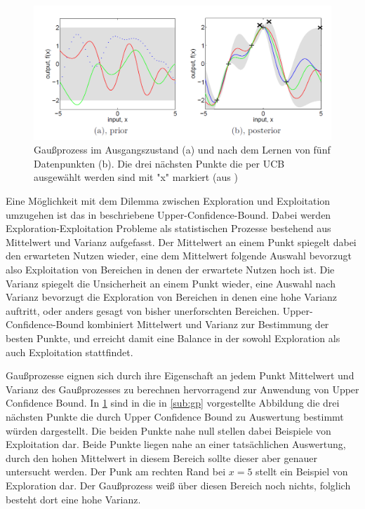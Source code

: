 \begin{figure}[h]
	\centering
	\includegraphics[width=1\linewidth]{bilder/ucb}
	\caption[Gaußprozess im Ausgangszustand (a) und nach dem Lernen von fünf Datenpunkten (b).]{Gaußprozess im Ausgangszustand (a) und nach dem Lernen von fünf Datenpunkten (b). Die drei nächsten Punkte die per UCB ausgewählt werden sind mit "x" markiert (aus \cite{Rasmussen.2008})}
	\label{fig:ucb}
\end{figure}
Eine Möglichkeit mit dem Dilemma zwischen Exploration und Exploitation umzugehen ist das in \cite{Auer.2002} beschriebene Upper-Confidence-Bound. Dabei werden Exploration-Exploitation Probleme als statistischen Prozesse bestehend aus Mittelwert und Varianz aufgefasst.
Der Mittelwert an einem Punkt spiegelt dabei den erwarteten Nutzen wieder, eine dem Mittelwert folgende Auswahl bevorzugt also Exploitation von Bereichen in denen der erwartete Nutzen hoch ist.
Die Varianz spiegelt die Unsicherheit an einem Punkt wieder, eine Auswahl nach Varianz bevorzugt die Exploration von Bereichen in denen eine hohe Varianz auftritt, oder anders gesagt von bisher unerforschten Bereichen.
Upper-Confidence-Bound kombiniert Mittelwert und Varianz zur Bestimmung der besten Punkte, und erreicht damit eine Balance in der sowohl Exploration als auch Exploitation stattfindet.

Gaußprozesse eignen sich durch ihre Eigenschaft an jedem Punkt Mittelwert und Varianz des Gaußprozesses zu berechnen hervorragend zur Anwendung von Upper Confidence Bound.
In \cref{fig:ucb} sind in die in \cref{sub:gp} vorgestellte Abbildung die drei nächsten Punkte die durch Upper Confidence Bound zu Auswertung bestimmt würden dargestellt.
Die beiden Punkte nahe null stellen dabei Beispiele von Exploitation dar. 
Beide Punkte liegen nahe an einer tatsächlichen Auswertung, durch den hohen Mittelwert in diesem Bereich sollte dieser aber genauer untersucht werden.
Der Punk am rechten Rand bei $x=5$ stellt ein Beispiel von Exploration dar.
Der Gaußprozess weiß über diesen Bereich noch nichts, folglich besteht dort eine hohe Varianz.

